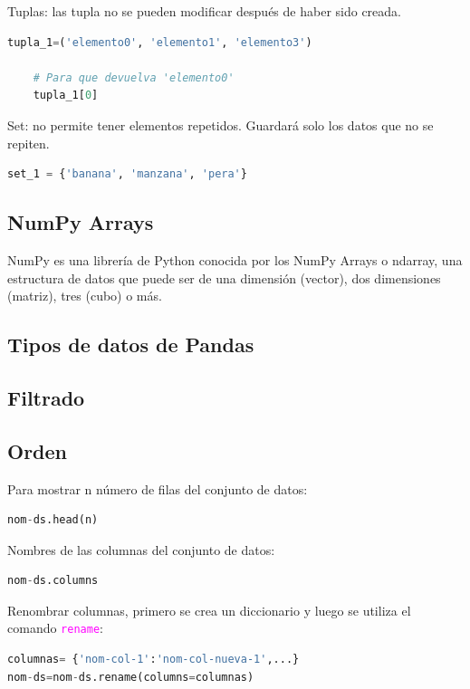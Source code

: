 \documentclass[a4paper, 12pt]{book}
\begin{document}
Tuplas: las tupla no se pueden modificar después de haber sido creada.
\begin{lstlisting}[language=Python]
	tupla_1=('elemento0', 'elemento1', 'elemento3')
	
	# Para que devuelva 'elemento0'
	tupla_1[0]
\end{lstlisting}

Set: no permite tener elementos repetidos. Guardará solo los datos que no se repiten.
\begin{lstlisting}[language=Python]
	set_1 = {'banana', 'manzana', 'pera'}
\end{lstlisting}
\subsection{NumPy Arrays}
NumPy es una librería de Python conocida por los NumPy Arrays o ndarray, una estructura de datos que puede ser de una dimensión (vector), dos dimensiones (matriz), tres (cubo) o más.

\subsection{Tipos de datos de Pandas}





\subsection{Filtrado}

\subsection{Orden}








Para mostrar n número de filas del conjunto de datos:
\begin{lstlisting}[language=Python]
nom-ds.head(n)
\end{lstlisting}

Nombres de las columnas del conjunto de datos:
\begin{lstlisting}[language=Python]
nom-ds.columns
\end{lstlisting}

Renombrar columnas, primero se crea un diccionario y luego se utiliza el comando \texttt{\textcolor{magenta}{rename}}:
\begin{lstlisting}[language=Python]
columnas= {'nom-col-1':'nom-col-nueva-1',...}
nom-ds=nom-ds.rename(columns=columnas)
\end{lstlisting}
\end{document}
